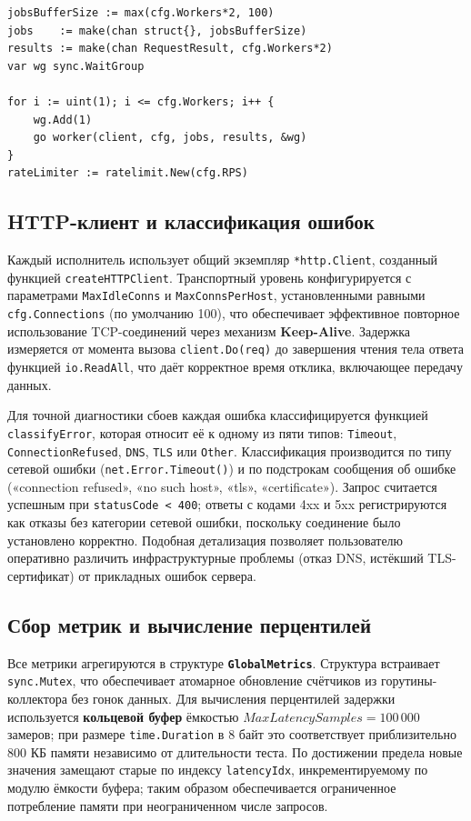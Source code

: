 \begin{lstlisting}[caption={Инициализация резерва исполнителей и ограничителя скорости в \texttt{RunAttackWithMetrics}},label={lst:workerpool}]
jobsBufferSize := max(cfg.Workers*2, 100)
jobs    := make(chan struct{}, jobsBufferSize)
results := make(chan RequestResult, cfg.Workers*2)
var wg sync.WaitGroup

for i := uint(1); i <= cfg.Workers; i++ {
    wg.Add(1)
    go worker(client, cfg, jobs, results, &wg)
}
rateLimiter := ratelimit.New(cfg.RPS)
\end{lstlisting}

\subsection*{HTTP-клиент и классификация ошибок}

Каждый исполнитель использует общий экземпляр \texttt{*http.Client}, созданный функцией \texttt{createHTTPClient}.
Транспортный уровень конфигурируется с параметрами \texttt{MaxIdleConns} и \texttt{MaxConnsPerHost}, установленными равными \texttt{cfg.Connections} (по умолчанию 100), что обеспечивает эффективное повторное использование TCP-соединений через механизм \textbf{Keep-Alive}.
Задержка измеряется от момента вызова \texttt{client.Do(req)} до завершения чтения тела ответа функцией \texttt{io.ReadAll}, что даёт корректное время отклика, включающее передачу данных.

Для точной диагностики сбоев каждая ошибка классифицируется функцией \texttt{classifyError}, которая относит её к одному из пяти типов: \texttt{Timeout}, \texttt{ConnectionRefused}, \texttt{DNS}, \texttt{TLS} или \texttt{Other}.
Классификация производится по типу сетевой ошибки (\texttt{net.Error.Timeout()}) и по подстрокам сообщения об ошибке («connection refused», «no such host», «tls», «certificate»).
Запрос считается успешным при \texttt{statusCode < 400}; ответы с кодами 4xx и 5xx регистрируются как отказы без категории сетевой ошибки, поскольку соединение было установлено корректно.
Подобная детализация позволяет пользователю оперативно различить инфраструктурные проблемы (отказ DNS, истёкший TLS-сертификат) от прикладных ошибок сервера.

\subsection*{Сбор метрик и вычисление перцентилей}

Все метрики агрегируются в структуре \textbf{\texttt{GlobalMetrics}}.
Структура встраивает \texttt{sync.Mutex}, что обеспечивает атомарное обновление счётчиков из горутины-коллектора без гонок данных.
Для вычисления перцентилей задержки используется \textbf{кольцевой буфер} ёмкостью \(\mathit{MaxLatencySamples} = 100\,000\) замеров; при размере \texttt{time.Duration} в 8 байт это соответствует приблизительно 800 КБ памяти независимо от длительности теста.
По достижении предела новые значения замещают старые по индексу \texttt{latencyIdx}, инкрементируемому по модулю ёмкости буфера; таким образом обеспечивается ограниченное потребление памяти при неограниченном числе запросов.

